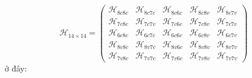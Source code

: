 \begin{equation}
\mathcal{H}_{14\times 14} =
\begin{pmatrix}
\mathcal{H}_{8c8c} & \mathcal{H}_{8c7c} & \mathcal{H}_{8c6c} & \mathcal{H}_{8c8v} & \mathcal{H}_{8c7v}\\
\mathcal{H}_{7c8c} & \mathcal{H}_{7c7v} & \mathcal{H}_{7c6c} & \mathcal{H}_{7c8v} & \mathcal{H}_{7c7v}\\
\mathcal{H}_{6c8c} & \mathcal{H}_{6c7c} & \mathcal{H}_{6c6c} & \mathcal{H}_{6c8v} & \mathcal{H}_{6c7v}\\
\mathcal{H}_{8v8c} & \mathcal{H}_{8v7c} & \mathcal{H}_{8v6c} & \mathcal{H}_{8v8v} & \mathcal{H}_{8v7v}\\
\mathcal{H}_{7v8c} & \mathcal{H}_{7v7c} & \mathcal{H}_{7v6c} & \mathcal{H}_{7v8v} & \mathcal{H}_{7v7v}
\end{pmatrix}
\end{equation}
ở đây:
